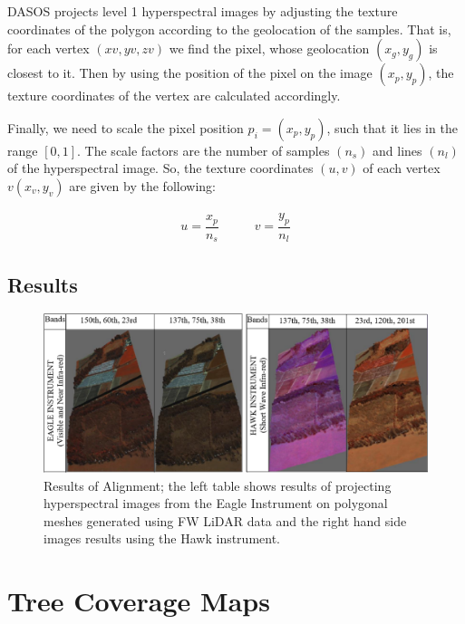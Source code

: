\documentclass{subfiles}
\begin{document}
				
	\par DASOS projects level 1 hyperspectral images by adjusting the texture coordinates of the polygon according to the geolocation of the samples. That is, for each vertex $(xv, yv , zv)$ we find the pixel, whose geolocation $(x_g, y_g )$ is closest to it. Then by using the position of the pixel on the image $(x_p, y_p)$, the texture coordinates of the vertex are calculated accordingly.
				
	\par Finally, we need to scale the pixel position $p_i = (x_p, y_p )$, such that it lies in the range $[0,1]$. The scale factors are the number of samples $(n_s)$ and lines $(n_l)$ of the hyperspectral image. So, the texture coordinates $(u, v)$ of each vertex $v(x_v , y_v)$ are given by the following:
		
	\begin{eqnarray}
	u=\dfrac{x_p}{n_s} \;\;\;\;\;\;\;\;\;\; v=\dfrac{y_p}{n_l}
	\end{eqnarray}
	
	\subsection {Results}
		
		  \begin{figure} [h!]
		  	\centering
		  	\includegraphics[width=\textwidth]{img/AlignmentEagle_Hawk}
		  	\caption[Results of Alignement]{Results of Alignment; the left table shows results of projecting hyperspectral images from the Eagle Instrument on polygonal meshes generated using FW LiDAR data and the right hand side images results using the Hawk instrument.}
		  	\label{fig:AlignementResults}
		  \end{figure}
		
		
\section{Tree Coverage Maps}
\end{document}
